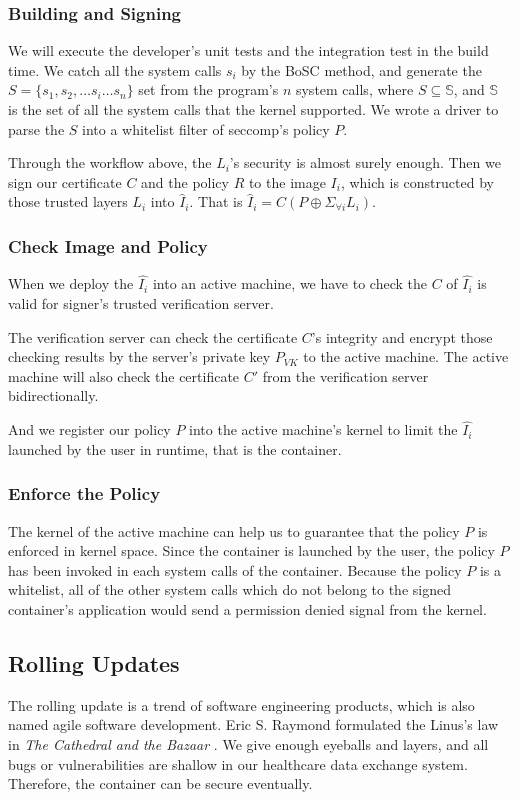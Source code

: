 \subsubsection{Building and Signing}

We will execute the developer's unit tests and the integration test in the build time.
We catch all the system calls $s_i$ by the BoSC \cite{1495942} method,
and generate the $S = \{s_1, s_2, \dots s_i \dots s_n\}$ set from the
program's $n$ system calls, where $S \subseteq \mathbb{S}$, and $\mathbb{S}$ is the set of
all the system calls that the kernel supported.  We wrote a driver to parse the $S$ into
a whitelist filter of seccomp's policy $P$.


Through the workflow above, the $L_i$'s security is almost surely enough.
Then we sign our certificate $C$ and the policy $R$ to the image $I_i$, which
is constructed by those trusted layers $L_i$ into $\hat I_{i}$. That is
$\hat I_{i} = C(P \oplus \Sigma_{\forall i} L_i)$.

\subsubsection{Check Image and Policy}
When we deploy the $\hat{I_i}$ into an active machine, we have to check the $C$ of
$\hat{I_i}$ is valid for signer's trusted verification server.

The verification server can check the certificate $C$'s integrity and encrypt those
checking results by the server's private key $P_{VK}$ to the active machine. The active
machine will also check the certificate $C'$ from the verification server bidirectionally.

And we register our policy $P$ into the active machine's kernel to limit the $\hat{I_i}$
launched by the user in runtime, that is the container.

\subsubsection{Enforce the Policy}

The kernel of the active machine can help us to guarantee that the policy $P$ is enforced in
kernel space. Since the container is launched by the user, the policy $P$
has been invoked in each system calls of the container. Because the policy $P$ is a whitelist,
all of the other system calls which do not belong to the signed container's application
would send a permission denied signal from the kernel.

\subsection{Rolling Updates}

The rolling update is a trend of software engineering products, which is
also named agile software development. Eric S. Raymond formulated
the Linus's law in \emph{The Cathedral and the Bazaar} \cite{9780596001087}.
We give enough eyeballs and layers, and all bugs or vulnerabilities are shallow in our
healthcare data exchange system. Therefore, the container can be secure eventually.
